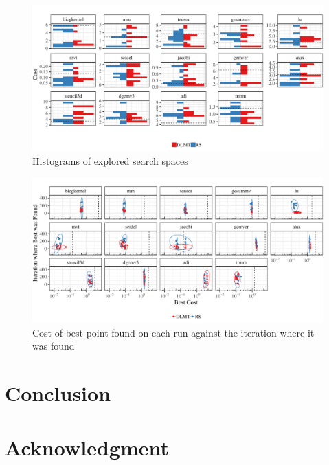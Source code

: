 \documentclass[conference]{IEEEtran}
\begin{document}
\begin{center}
\begin{figure}[p]
\centering
\includegraphics[width=.9\textwidth]{./img/split_histograms.pdf}
\caption{\label{fig:org8e126cc}
Histograms of explored search spaces}
\end{figure}
\end{center}

\begin{center}
\begin{figure}[p]
\centering
\includegraphics[width=.9\textwidth]{./img/iteration_best_comparison.pdf}
\caption{\label{fig:orga16a52a}
Cost of best point found on each run against the iteration where it was found}
\end{figure}
\end{center}
\section{Conclusion}
\label{sec:orgc848b7c}
\section*{Acknowledgment}
\label{sec:orgeac5a89}


\end{document}
